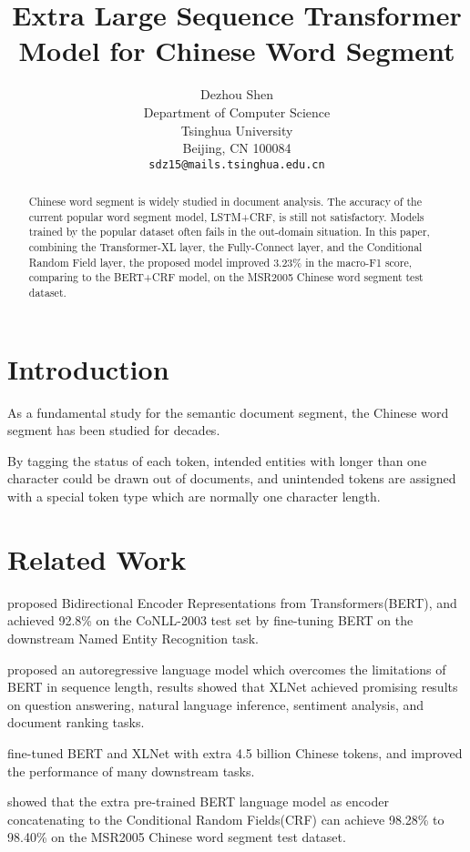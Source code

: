 \documentclass[11pt,a4paper]{article}
\title{Extra Large Sequence Transformer Model for Chinese Word Segment}
\author{Dezhou Shen \\
  Department of Computer Science\\
  Tsinghua University\\
  Beijing, CN 100084\\
  \texttt{sdz15@mails.tsinghua.edu.cn} \\}
\date{}
\begin{document}
\maketitle
\begin{abstract}
 Chinese word segment is widely studied in document analysis.
 The accuracy of the current popular word segment model, LSTM+CRF, is still not satisfactory.
 Models trained by the popular dataset often fails in the out-domain situation.
 In this paper, combining the Transformer-XL layer, the Fully-Connect layer, and the Conditional Random Field layer,
 the proposed model improved 3.23\% in the macro-F1 score, comparing to the BERT+CRF model, on the MSR2005 Chinese word segment test dataset.
\end{abstract}

\section{Introduction}

 As a fundamental study for the semantic document segment, the Chinese word segment has been studied for decades.

 By tagging the status of each token, intended entities with longer than one character could be drawn out of documents,
 and unintended tokens are assigned with a special token type which are normally one character length.

\section{Related Work}

  \citet{devlin2019bert} proposed Bidirectional Encoder Representations from Transformers(BERT), and achieved 92.8\% on the CoNLL-2003 test set by
fine-tuning BERT on the downstream Named Entity Recognition task.

  \citet{yang2019xlnet} proposed an autoregressive language model which overcomes the limitations of BERT in sequence length,
results showed that XLNet achieved promising results on question answering, natural language inference, sentiment analysis, and document ranking tasks.

  \citet{cui2020revisiting} fine-tuned BERT and XLNet with extra 4.5 billion Chinese tokens, and improved the performance of many downstream tasks.

  \citet{tian2020improving} showed that the extra pre-trained BERT language model as encoder concatenating to the Conditional Random Fields(CRF) can achieve 98.28\% to 98.40\% on the MSR2005 Chinese word segment test dataset.
\end{document}
